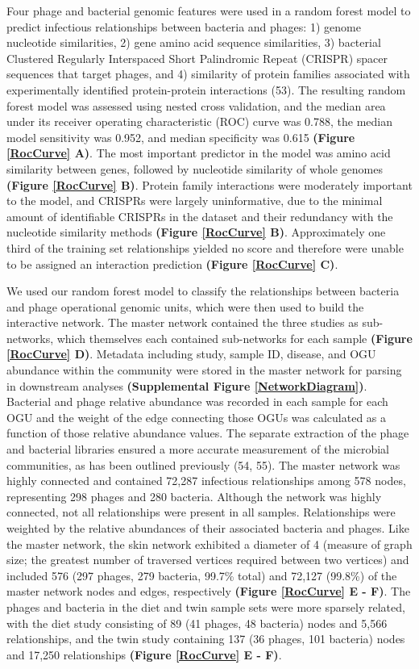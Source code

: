 \documentclass[12pt,]{article}
\begin{document}
Four phage and bacterial genomic features were used in a random forest
model to predict infectious relationships between bacteria and phages:
1) genome nucleotide similarities, 2) gene amino acid sequence
similarities, 3) bacterial Clustered Regularly Interspaced Short
Palindromic Repeat (CRISPR) spacer sequences that target phages, and 4)
similarity of protein families associated with experimentally identified
protein-protein interactions (53). The resulting random forest model was
assessed using nested cross validation, and the median area under its
receiver operating characteristic (ROC) curve was 0.788, the median
model sensitivity was 0.952, and median specificity was 0.615
\textbf{(Figure \ref{RocCurve} A)}. The most important predictor in the
model was amino acid similarity between genes, followed by nucleotide
similarity of whole genomes \textbf{(Figure \ref{RocCurve} B)}. Protein
family interactions were moderately important to the model, and CRISPRs
were largely uninformative, due to the minimal amount of identifiable
CRISPRs in the dataset and their redundancy with the nucleotide
similarity methods \textbf{(Figure \ref{RocCurve} B)}. Approximately one
third of the training set relationships yielded no score and therefore
were unable to be assigned an interaction prediction \textbf{(Figure
\ref{RocCurve} C)}.

We used our random forest model to classify the relationships between
bacteria and phage operational genomic units, which were then used to
build the interactive network. The master network contained the three
studies as sub-networks, which themselves each contained sub-networks
for each sample \textbf{(Figure \ref{RocCurve} D)}. Metadata including
study, sample ID, disease, and OGU abundance within the community were
stored in the master network for parsing in downstream analyses
\textbf{(Supplemental Figure \ref{NetworkDiagram})}. Bacterial and phage
relative abundance was recorded in each sample for each OGU and the
weight of the edge connecting those OGUs was calculated as a function of
those relative abundance values. The separate extraction of the phage
and bacterial libraries ensured a more accurate measurement of the
microbial communities, as has been outlined previously (54, 55). The
master network was highly connected and contained 72,287 infectious
relationships among 578 nodes, representing 298 phages and 280 bacteria.
Although the network was highly connected, not all relationships were
present in all samples. Relationships were weighted by the relative
abundances of their associated bacteria and phages. Like the master
network, the skin network exhibited a diameter of 4 (measure of graph
size; the greatest number of traversed vertices required between two
vertices) and included 576 (297 phages, 279 bacteria, 99.7\% total) and
72,127 (99.8\%) of the master network nodes and edges, respectively
\textbf{(Figure \ref{RocCurve} E - F)}. The phages and bacteria in the
diet and twin sample sets were more sparsely related, with the diet
study consisting of 89 (41 phages, 48 bacteria) nodes and 5,566
relationships, and the twin study containing 137 (36 phages, 101
bacteria) nodes and 17,250 relationships \textbf{(Figure \ref{RocCurve}
E - F)}.
\end{document}
